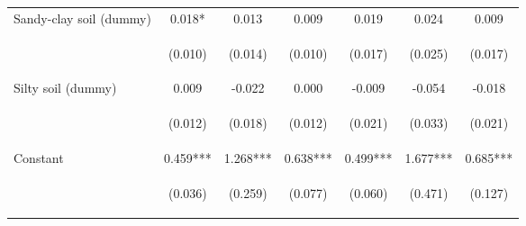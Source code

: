 \begin{center}
\begin{tabular}{lcccccc}
Sandy-clay soil (dummy) & 0.018* & 0.013 & 0.009 & 0.019 & 0.024 & 0.009 \\
\vspace{4pt} & \begin{footnotesize}(0.010)\end{footnotesize} & \begin{footnotesize}(0.014)\end{footnotesize} & \begin{footnotesize}(0.010)\end{footnotesize} & \begin{footnotesize}(0.017)\end{footnotesize} & \begin{footnotesize}(0.025)\end{footnotesize} & \begin{footnotesize}(0.017)\end{footnotesize} \\
Silty soil (dummy) & 0.009 & -0.022 & 0.000 & -0.009 & -0.054 & -0.018 \\
\vspace{4pt} & \begin{footnotesize}(0.012)\end{footnotesize} & \begin{footnotesize}(0.018)\end{footnotesize} & \begin{footnotesize}(0.012)\end{footnotesize} & \begin{footnotesize}(0.021)\end{footnotesize} & \begin{footnotesize}(0.033)\end{footnotesize} & \begin{footnotesize}(0.021)\end{footnotesize} \\
Constant & 0.459*** & 1.268*** & 0.638*** & 0.499*** & 1.677*** & 0.685*** \\
 & \begin{footnotesize}(0.036)\end{footnotesize} & \begin{footnotesize}(0.259)\end{footnotesize} & \begin{footnotesize}(0.077)\end{footnotesize} & \begin{footnotesize}(0.060)\end{footnotesize} & \begin{footnotesize}(0.471)\end{footnotesize} & \begin{footnotesize}(0.127)\end{footnotesize} \\

\end{tabular}
\end{center}

